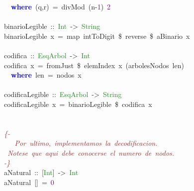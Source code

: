 \begin{allintypewriter}
\mbox{}\ \ \textbf{\textcolor{Blue}{where}}\ \textcolor{BrickRed}{(}q\textcolor{BrickRed}{,}r\textcolor{BrickRed}{)}\ \textcolor{BrickRed}{=}\ divMod\ \textcolor{BrickRed}{(}n\textcolor{BrickRed}{-}\textcolor{Purple}{1}\textcolor{BrickRed}{)}\ \textcolor{Purple}{2} \\
\mbox{} \\
\mbox{}binarioLegible\ \textcolor{BrickRed}{::}\ \textcolor{ForestGreen}{Int}\ \textcolor{BrickRed}{-\textgreater{}}\ \textcolor{ForestGreen}{String} \\
\mbox{}binarioLegible\ x\ \textcolor{BrickRed}{=}\ map\ intToDigit\ \textcolor{BrickRed}{\$}\ reverse\ \textcolor{BrickRed}{\$}\ aBinario\ x \\
\mbox{} \\
\mbox{}codifica\ \textcolor{BrickRed}{::}\ \textcolor{ForestGreen}{EsqArbol}\ \textcolor{BrickRed}{-\textgreater{}}\ \textcolor{ForestGreen}{Int} \\
\mbox{}codifica\ x\ \textcolor{BrickRed}{=}\ fromJust\ \textcolor{BrickRed}{\$}\ elemIndex\ x\ \textcolor{BrickRed}{(}arbolesNodos\ len\textcolor{BrickRed}{)} \\
\mbox{}\ \ \textbf{\textcolor{Blue}{where}}\ len\ \textcolor{BrickRed}{=}\ nodos\ x \\
\mbox{} \\
\mbox{}codificaLegible\ \textcolor{BrickRed}{::}\ \textcolor{ForestGreen}{EsqArbol}\ \textcolor{BrickRed}{-\textgreater{}}\ \textcolor{ForestGreen}{String} \\
\mbox{}codificaLegible\ x\ \textcolor{BrickRed}{=}\ binarioLegible\ \textcolor{BrickRed}{\$}\ codifica\ x \\
\mbox{} \\
\mbox{} \\
\mbox{}\textit{\textcolor{Brown}{\{-\ }} \\
\mbox{}\textit{\textcolor{Brown}{\ \ \ Por\ ultimo,\ implementamos\ la\ decodificacion.\ }} \\
\mbox{}\textit{\textcolor{Brown}{\ Notese\ que\ aqui\ debe\ conocerse\ el\ numero\ de\ nodos.}} \\
\mbox{}\textit{\textcolor{Brown}{-\}}} \\
\mbox{}aNatural\ \textcolor{BrickRed}{::}\ \textcolor{BrickRed}{[}\textcolor{ForestGreen}{Int}\textcolor{BrickRed}{]}\ \textcolor{BrickRed}{-\textgreater{}}\ \textcolor{ForestGreen}{Int} \\
\mbox{}aNatural\ \textcolor{BrickRed}{[]}\ \textcolor{BrickRed}{=}\ \textcolor{Purple}{0} \\

\end{allintypewriter}
